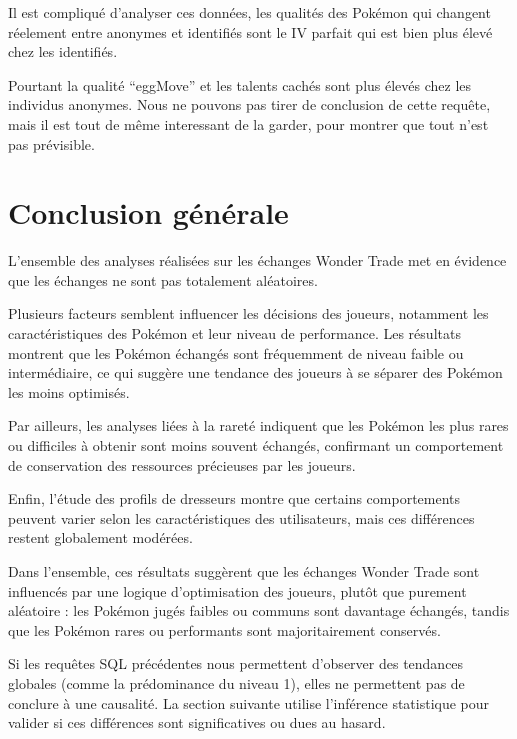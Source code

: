 \documentclass[mstat,12pt]{unswthesis}
\begin{document}
Il est compliqué d'analyser ces données, les qualités des Pokémon qui
changent réelement entre anonymes et identifiés sont le IV parfait qui
est bien plus élevé chez les identifiés.

Pourtant la qualité ``eggMove'' et les talents cachés sont plus élevés
chez les individus anonymes. Nous ne pouvons pas tirer de conclusion de
cette requête, mais il est tout de même interessant de la garder, pour
montrer que tout n'est pas prévisible.

\bigskip
\bigskip

\section{Conclusion générale}\label{conclusion-guxe9nuxe9rale}

L'ensemble des analyses réalisées sur les échanges Wonder Trade met en
évidence que les échanges ne sont pas totalement aléatoires.

Plusieurs facteurs semblent influencer les décisions des joueurs,
notamment les caractéristiques des Pokémon et leur niveau de
performance. Les résultats montrent que les Pokémon échangés sont
fréquemment de niveau faible ou intermédiaire, ce qui suggère une
tendance des joueurs à se séparer des Pokémon les moins optimisés.

Par ailleurs, les analyses liées à la rareté indiquent que les Pokémon
les plus rares ou difficiles à obtenir sont moins souvent échangés,
confirmant un comportement de conservation des ressources précieuses par
les joueurs.

Enfin, l'étude des profils de dresseurs montre que certains
comportements peuvent varier selon les caractéristiques des
utilisateurs, mais ces différences restent globalement modérées.

Dans l'ensemble, ces résultats suggèrent que les échanges Wonder Trade
sont influencés par une logique d'optimisation des joueurs, plutôt que
purement aléatoire : les Pokémon jugés faibles ou communs sont davantage
échangés, tandis que les Pokémon rares ou performants sont
majoritairement conservés.

\bigskip
\bigskip

Si les requêtes SQL précédentes nous permettent d'observer des tendances
globales (comme la prédominance du niveau 1), elles ne permettent pas de
conclure à une causalité. La section suivante utilise l'inférence
statistique pour valider si ces différences sont significatives ou dues
au hasard.
\end{document}
